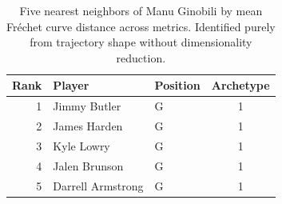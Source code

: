 \begin{table}[htbp]
  \centering\small
  \begin{tabular}{rllc}
    \toprule
    Rank & Player & Position & Archetype \\
    \midrule
    1 & Jimmy Butler & G & 1 \\
    2 & James Harden & G & 1 \\
    3 & Kyle Lowry & G & 1 \\
    4 & Jalen Brunson & G & 1 \\
    5 & Darrell Armstrong & G & 1 \\
    \bottomrule
  \end{tabular}
  \caption{Five nearest neighbors of Manu Ginobili by mean Fr\'{e}chet curve distance across metrics. Identified purely from trajectory shape without dimensionality reduction.}
  \label{tab:Manu_Ginobili_frechet_curve_neighbors}
\end{table}

